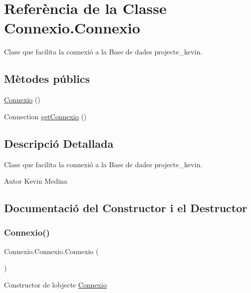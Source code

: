 \hypertarget{class_connexio_1_1_connexio}{}\section{Referència de la Classe Connexio.\+Connexio}
\label{class_connexio_1_1_connexio}


Clase que facilita la connexió a la Base de dades projecte\+\_\+kevin.  


\subsection*{Mètodes públics}
\begin{DoxyCompactItemize}
\item 
\mbox{\hyperlink{class_connexio_1_1_connexio_af54a589e94ff116f56c3a0d308c0b158}{Connexio}} ()
\item 
Connection \mbox{\hyperlink{class_connexio_1_1_connexio_a32d5077179258391ba99699a87a4cff2}{get\+Connexio}} ()
\end{DoxyCompactItemize}


\subsection{Descripció Detallada}
Clase que facilita la connexió a la Base de dades projecte\+\_\+kevin. 

\begin{DoxyAuthor}{Autor}
Kevin Medina 
\end{DoxyAuthor}


\subsection{Documentació del Constructor i el Destructor}
\mbox{\label{class_connexio_1_1_connexio_af54a589e94ff116f56c3a0d308c0b158}} 
\subsubsection{\texorpdfstring{Connexio()}{Connexio()}}
{\footnotesize\ttfamily Connexio.\+Connexio.\+Connexio (\begin{DoxyParamCaption}{ }\end{DoxyParamCaption})}

Constructor de l\textquotesingle{}objecte \mbox{\hyperlink{class_connexio_1_1_connexio}{Connexio}} 


